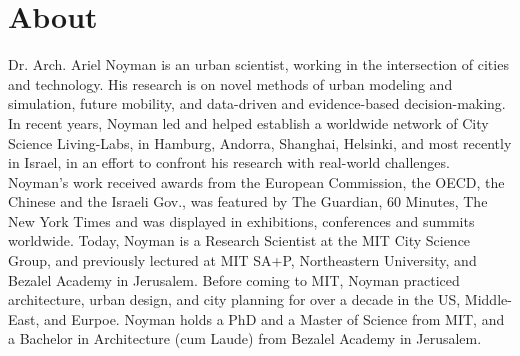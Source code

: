 \section*{About}

 {
Dr. Arch. Ariel Noyman is an urban scientist, working in the intersection of cities and technology. His research is on novel methods of urban modeling and simulation, future mobility, and data-driven and evidence-based decision-making. In recent years, Noyman led and helped establish a worldwide network of City Science Living-Labs, in Hamburg, Andorra, Shanghai, Helsinki, and most recently in Israel, in an effort to confront his research with real-world challenges. 
Noyman's work received awards from the European Commission, the OECD, the Chinese and the Israeli Gov., was featured by The Guardian, 60 Minutes, The New York Times and was displayed in exhibitions, conferences and summits worldwide. Today, Noyman is a Research Scientist at the MIT City Science Group, and previously lectured at MIT SA+P, Northeastern University, and Bezalel Academy in Jerusalem. Before coming to MIT, Noyman practiced architecture, urban design, and city planning for over a decade in the US, Middle-East, and Eurpoe. Noyman holds a PhD and a Master of Science from MIT, and a Bachelor in Architecture (cum Laude) from Bezalel Academy in Jerusalem.
 }


